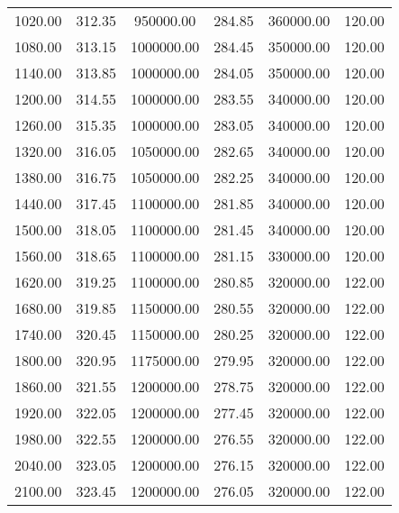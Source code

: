 \begin{table}
\begin{tabular}{c c c c c c}
      1020.00  &      312.35  &   950000.00  &      284.85  &   360000.00  &      120.00\\
      1080.00  &      313.15  &  1000000.00  &      284.45  &   350000.00  &      120.00\\
      1140.00  &      313.85  &  1000000.00  &      284.05  &   350000.00  &      120.00\\
      1200.00  &      314.55  &  1000000.00  &      283.55  &   340000.00  &      120.00\\
      1260.00  &      315.35  &  1000000.00  &      283.05  &   340000.00  &      120.00\\
      1320.00  &      316.05  &  1050000.00  &      282.65  &   340000.00  &      120.00\\
      1380.00  &      316.75  &  1050000.00  &      282.25  &   340000.00  &      120.00\\
      1440.00  &      317.45  &  1100000.00  &      281.85  &   340000.00  &      120.00\\
      1500.00  &      318.05  &  1100000.00  &      281.45  &   340000.00  &      120.00\\
      1560.00  &      318.65  &  1100000.00  &      281.15  &   330000.00  &      120.00\\
      1620.00  &      319.25  &  1100000.00  &      280.85  &   320000.00  &      122.00\\
      1680.00  &      319.85  &  1150000.00  &      280.55  &   320000.00  &      122.00\\
      1740.00  &      320.45  &  1150000.00  &      280.25  &   320000.00  &      122.00\\
      1800.00  &      320.95  &  1175000.00  &      279.95  &   320000.00  &      122.00\\
      1860.00  &      321.55  &  1200000.00  &      278.75  &   320000.00  &      122.00\\
      1920.00  &      322.05  &  1200000.00  &      277.45  &   320000.00  &      122.00\\
      1980.00  &      322.55  &  1200000.00  &      276.55  &   320000.00  &      122.00\\
      2040.00  &      323.05  &  1200000.00  &      276.15  &   320000.00  &      122.00\\
      2100.00  &      323.45  &  1200000.00  &      276.05  &   320000.00  &      122.00\\   
        \bottomrule
    \end{tabular}
\end{table}


